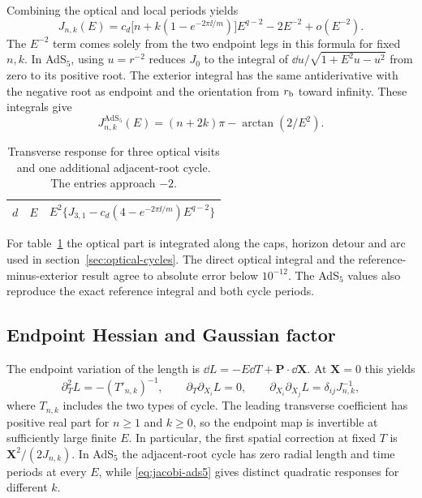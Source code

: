 Combining the optical and local periods yields
\begin{equation}
 J_{n,k}(E)
 =c_d\big[n+k(1-e^{-2\pi\ii/m})\big] E^{q-2}
       -2E^{-2}+o(E^{-2}).
 \label{eq:jacobi-combined}
\end{equation}
The \(E^{-2}\) term comes solely from the two endpoint legs in
this formula for fixed \(n,k\). In AdS\(_5\), using \(u=r^{-2}\)
reduces \(J_0\) to the integral of
\(\dd u/\sqrt{1+E^2u-u^2}\) from zero to its positive root.
The exterior integral has the same antiderivative with the
negative root as endpoint and the orientation from \(r_{\rm b}\)
toward infinity. These integrals give
\begin{equation}
 J_{n,k}^{\mathrm{AdS}_5}(E)
     =(n+2k)\pi-\arctan(2/E^2).
 \label{eq:jacobi-ads5}
\end{equation}

\begin{table}[t]
 \centering\small
 \begin{tabular}{ccc}
 \hline
 \(d\) & \(E\) & \(E^2\big\{J_{3,1}-c_d(4-e^{-2\pi\ii/m})E^{q-2}\big\}\) \\
 \hline
 
 \end{tabular}
 \caption{Transverse response for three optical visits and one
 additional adjacent-root cycle. The entries approach \(-2\).}
 \label{tab:geodesic-jacobi}
\end{table}

For table~\ref{tab:geodesic-jacobi} the optical part is integrated
along the caps, horizon detour and arc used in section~\ref{sec:optical-cycles}.
The direct optical integral and the reference-minus-exterior result
agree to absolute error below \(10^{-12}\). The AdS\(_5\) values
also reproduce the exact reference integral and both cycle periods.

\subsection{Endpoint Hessian and Gaussian factor}

The endpoint variation of the length is
\(\dd L=-E\dd T+\boldsymbol P\cdot\dd\boldsymbol X\).
At \(\boldsymbol X=0\) this yields
\begin{equation}
 \partial_T^2 L=-(T'_{n,k})^{-1},\qquad
 \partial_T\partial_{X_i}L=0,\qquad
 \partial_{X_i}\partial_{X_j}L=\delta_{ij}J_{n,k}^{-1},
 \label{eq:jacobi-hessian}
\end{equation}
where \(T_{n,k}\) includes the two types of cycle.
The leading transverse coefficient has positive real part
for \(n\geq1\) and \(k\geq0\), so the endpoint map is invertible
at sufficiently large finite \(E\).
In particular, the first spatial correction at fixed
\(T\) is \(\boldsymbol X^2/(2J_{n,k})\). In AdS\(_5\) the
adjacent-root cycle has zero radial length and time periods
at every \(E\), while \eqref{eq:jacobi-ads5} gives distinct
quadratic responses for different \(k\).

